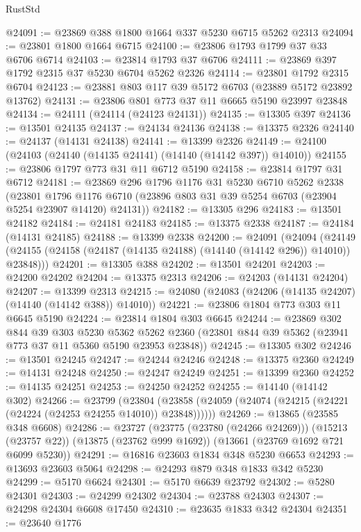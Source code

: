 \begin{lexlean}{RustStd}
\begin{coremodule}
@24091 := @23869 @388 @1800 @1664 @337 @5230 @6715 @5262 @2313
@24094 := @23801 @1800 @1664 @6715
@24100 := @23806 @1793 @1799 @37 @33 @6706 @6714
@24103 := @23814 @1793 @37 @6706
@24111 := @23869 @397 @1792 @2315 @37 @5230 @6704 @5262 @2326
@24114 := @23801 @1792 @2315 @6704
@24123 := @23881 @803 @117 @39 @5172 @6703 (@23889 @5172 @23892 @13762)
@24131 := @23806 @801 @773 @37 @11 @6665 @5190 @23997 @23848
@24134 := @24111 (@24114 (@24123 @24131))
@24135 := @13305 @397
@24136 := @13501 @24135
@24137 := @24134 @24136
@24138 := @13375 @2326
@24140 := @24137 (@14131 @24138)
@24141 := @13399 @2326
@24149 := @24100 (@24103 (@24140 (@14135 @24141) (@14140 (@14142 @397)) @14010))
@24155 := @23806 @1797 @773 @31 @11 @6712 @5190
@24158 := @23814 @1797 @31 @6712
@24181 := @23869
    @296
    @1796
    @1176
    @31
    @5230
    @6710
    @5262
    @2338
    (@23801 @1796 @1176 @6710 (@23896 @803 @31 @39 @5254 @6703 (@23904 @5254 @23907 @14120) @24131))
@24182 := @13305 @296
@24183 := @13501 @24182
@24184 := @24181 @24183
@24185 := @13375 @2338
@24187 := @24184 (@14131 @24185)
@24188 := @13399 @2338
@24200 := @24091
    (@24094
      (@24149 (@24155 (@24158 (@24187 (@14135 @24188) (@14140 (@14142 @296)) @14010)) @23848)))
@24201 := @13305 @388
@24202 := @13501 @24201
@24203 := @24200 @24202
@24204 := @13375 @2313
@24206 := @24203 (@14131 @24204)
@24207 := @13399 @2313
@24215 := @24080 (@24083 (@24206 (@14135 @24207) (@14140 (@14142 @388)) @14010))
@24221 := @23806 @1804 @773 @303 @11 @6645 @5190
@24224 := @23814 @1804 @303 @6645
@24244 := @23869
    @302
    @844
    @39
    @303
    @5230
    @5362
    @5262
    @2360
    (@23801 @844 @39 @5362 (@23941 @773 @37 @11 @5360 @5190 @23953 @23848))
@24245 := @13305 @302
@24246 := @13501 @24245
@24247 := @24244 @24246
@24248 := @13375 @2360
@24249 := @14131 @24248
@24250 := @24247 @24249
@24251 := @13399 @2360
@24252 := @14135 @24251
@24253 := @24250 @24252
@24255 := @14140 (@14142 @302)
@24266 := @23799
    (@23804 (@23858 (@24059 (@24074 (@24215 (@24221 (@24224 (@24253 @24255 @14010)) @23848))))))
@24269 := @13865 (@23585 @348 @6608)
@24286 := @23727
    (@23775 (@23780 (@24266 @24269)))
    (@15213 (@23757 @22))
    (@13875 (@23762 @999 @1692))
    (@13661 (@23769 @1692 @721 @6099 @5230))
@24291 := @16816 @23603 @1834 @348 @5230 @6653
@24293 := @13693 @23603 @5064
@24298 := @24293 @879 @348 @1833 @342 @5230
@24299 := @5170 @6624
@24301 := @5170 @6639 @23792
@24302 := @5280 @24301
@24303 := @24299 @24302
@24304 := @23788 @24303
@24307 := @24298 @24304 @6608 @17450
@24310 := @23635 @1833 @342 @24304
@24351 := @23640
    @1776

\end{coremodule}
\end{lexlean}
